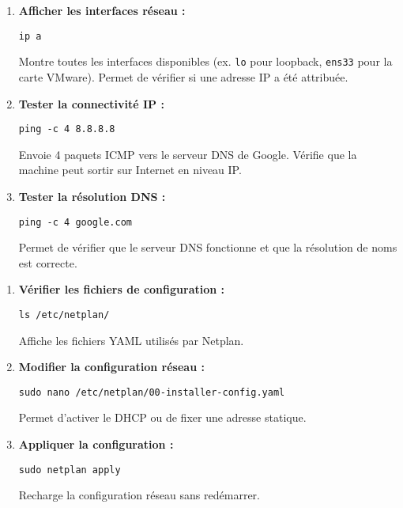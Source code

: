 \documentclass[11pt,a4paper]{article}
\begin{document}
\begin{tcolorbox}[title={1. Vérification du réseau}]
\begin{enumerate}
  \item \textbf{Afficher les interfaces réseau :}
\begin{verbatim}
ip a
\end{verbatim}
Montre toutes les interfaces disponibles (ex. \texttt{lo} pour loopback, \texttt{ens33} pour la carte VMware). Permet de vérifier si une adresse IP a été attribuée.

  \item \textbf{Tester la connectivité IP :}
\begin{verbatim}
ping -c 4 8.8.8.8
\end{verbatim}
Envoie 4 paquets ICMP vers le serveur DNS de Google. Vérifie que la machine peut sortir sur Internet en niveau IP.

  \item \textbf{Tester la résolution DNS :}
\begin{verbatim}
ping -c 4 google.com
\end{verbatim}
Permet de vérifier que le serveur DNS fonctionne et que la résolution de noms est correcte.
\end{enumerate}
\end{tcolorbox}

\begin{tcolorbox}[title={2. Gestion du réseau avec Netplan}]
\begin{enumerate}
  \item \textbf{Vérifier les fichiers de configuration :}
\begin{verbatim}
ls /etc/netplan/
\end{verbatim}
Affiche les fichiers YAML utilisés par Netplan.

  \item \textbf{Modifier la configuration réseau :}
\begin{verbatim}
sudo nano /etc/netplan/00-installer-config.yaml
\end{verbatim}
Permet d’activer le DHCP ou de fixer une adresse statique.

  \item \textbf{Appliquer la configuration :}
\begin{verbatim}
sudo netplan apply
\end{verbatim}
Recharge la configuration réseau sans redémarrer.
\end{enumerate}
\end{tcolorbox}
\end{document}
